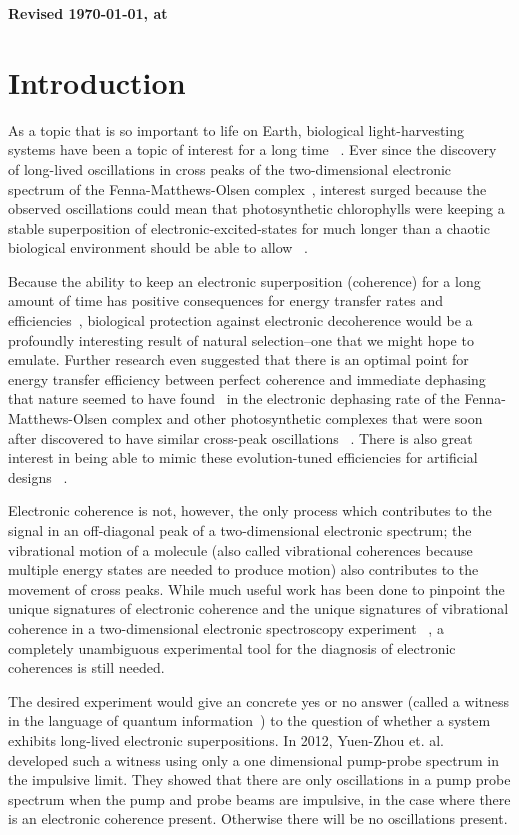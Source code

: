 \textbf{Revised \today , at \currenttime}

\section{Introduction}

As a topic that is so important to life on Earth, biological light-harvesting systems have been a topic of interest for a long time ~\cite{Blankenship2002}.   Ever since the discovery of long-lived oscillations in cross peaks of the two-dimensional electronic spectrum of the Fenna-Matthews-Olsen complex~\cite{FMO1}, interest surged because the observed oscillations could mean that photosynthetic chlorophylls were keeping a stable superposition of electronic-excited-states for much longer than a chaotic biological environment should be able to allow ~\cite{FMO2,Lambert2012}.

Because the ability to keep an electronic superposition (coherence) for a long amount of time has positive consequences for energy transfer rates and efficiencies~\cite{FMO1}, biological protection against electronic decoherence would be a profoundly interesting result of natural selection--one that we might hope to emulate.  Further research even suggested that there is an optimal point for energy transfer efficiency between perfect coherence and immediate dephasing that nature seemed to have found~\cite{energyTransfer} in the electronic dephasing rate of the Fenna-Matthews-Olsen complex and other photosynthetic complexes that were soon after discovered to have similar cross-peak oscillations ~\cite{Panitchayangkoon2011,Fidler2013,Collini2010}.  There is also great interest in being able to mimic these evolution-tuned efficiencies for artificial designs ~\cite{Creatore2013}.

Electronic coherence is not, however, the only process which contributes to the signal in an off-diagonal peak of a two-dimensional electronic spectrum; the vibrational motion of a molecule (also called vibrational coherences because multiple energy states are needed to produce motion) also contributes to the movement of cross peaks.  While much useful work has been done to pinpoint the  unique signatures of electronic coherence and the unique signatures of vibrational coherence in a two-dimensional electronic spectroscopy experiment ~\cite{FMO2,mech2,mech3,mech1,mech4}, a completely unambiguous experimental tool for the diagnosis of electronic coherences is still needed.

The desired experiment would give an concrete yes or no answer (called a witness in the language of quantum information~\cite{Chuang2005}) to the question of whether a system exhibits long-lived electronic superpositions.  In 2012, Yuen-Zhou et. al.~\cite{witness} developed such a witness using only a one dimensional pump-probe spectrum in the impulsive limit.  They showed that there are only oscillations in a pump probe spectrum when the pump and probe beams are impulsive, in the case where there is an electronic coherence present.  Otherwise there will be no oscillations present.


